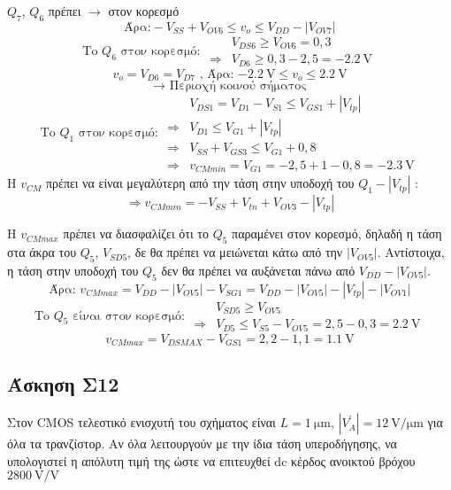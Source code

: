 \documentclass[11pt,a4paper,titlepage,fleqn]{article}
\begin{document}
	$Q_7$, $Q_6$ πρέπει $\rightarrow$ στον κορεσμό
	\[
	\text{Άρα:} - V_{SS} + V_{OV6} \leq v_o \leq V_{DD} - \left|V_{OV7}\right| 
	\]
	\[
	\text{To $Q_6$ στον κορεσμό: }\begin{aligned}
		& V_{DS6} \geq V_{OV6} = 0,3 \\ \Rightarrow & V_{D6} \geq 0,3 - 2,5 = \SI{-2,2}{\volt}
	\end{aligned}
	\]
	\[
	v_o = V_{D6} = V_{D7} \text{ ,  Άρα: } \SI{-2,2}{\volt} \leq v_o \leq \SI{2,2}{\volt}
	\]
	\[\rightarrow \text{ Περιοχή κοινού σήματος}\]
	\[\text{Το $Q_1$ στον κορεσμό: } 
	\begin{aligned}
		& V_{DS1} = V_{D1}- V_{S1} \leq V_{GS1} + \left| V_{tp}\right| \\ \Rightarrow & V_{D1} \leq V_{G1} + \left|V_{tp}\right| \\ \Rightarrow & V_{SS} + V_{GS3} \leq V_{G1} + 0,8  \\ \Rightarrow & v_{CMmin} = V_{G1} = -2,5+1-0,8= \SI{-2,3}{\volt}\end{aligned} \]
	Η $v_{CM}$ πρέπει να είναι μεγαλύτερη από την τάση στην υποδοχή του $Q_1 - \left|V_{tp}\right|$ :
	\[\Rightarrow v_{CMmin} = -V_{SS} + V_{tn} + V_{OV3} - \left|V_{tp}\right|\]
	
	Η $v_{CMmax}$ πρέπει να διασφαλίζει ότι το $Q_5$ παραμένει στον κορεσμό, δηλαδή η τάση στα άκρα του $Q_5$, $V_{SD5}$, δε θα πρέπει να μειώνεται κάτω από την $\left|V_{OV5}\right|$. Αντίστοιχα, η τάση στην υποδοχή του $Q_5$ δεν θα πρέπει να αυξάνεται πάνω από $V_{DD} - \left|V_{OV5}\right|$.
	\[\text{Άρα: } v_{CMmax} = V_{DD} - \left|V_{OV5}\right| - V_{SG1} = V_{DD} - \left|V_{OV5}\right| - \left|V_{tp}\right| - \left|V_{OV1}\right|
	\]
	\[\text{Το $Q_5$ είναι στον κορεσμό: } 
	\begin{aligned}
		& V_{SD5} \geq V_{OV5} \\ \Rightarrow & V_{D5} \leq V_{S5} - V_{OV5} = 2,5 - 0,3 = \SI{2,2}{\volt}
	\end{aligned} \]
	\[v_{CMmax} = V_{DSMAX} - V_{GS1} = 2,2-1,1 = \SI{1,1}{\volt}\]

\subsection{Άσκηση Σ12}
\label{sec:Poly.S12}
	
		Στον CMOS τελεστικό ενισχυτή του σχήματος είναι $L=\SI{1}{\micro\metre}$, $|V^{'}_A| = \SI[per-mode=symbol]{12}{\volt\per\micro\metre}$ για όλα τα τρανζίστορ. Αν όλα λειτουργούν με την ίδια τάση υπεροδήγησης, να υπολογιστεί η απόλυτη τιμή της ώστε να επιτευχθεί dc κέρδος ανοικτού βρόχου $\SI[per-mode=symbol]{2800}{\volt\per\volt}$
		
\end{document}
